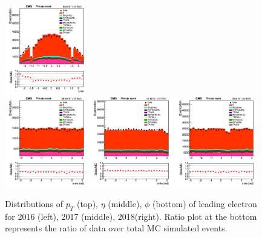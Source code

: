 \documentclass{cernatlasnote}
\newcommand{\pt}{$p_{\text T}$\xspace}
\begin{document}
\begin{figure}[htp]
 \includegraphics[width=0.32\textwidth]{images/emu_channel/2018/18_Range_0pt7_1pt3/subleading_electron_eta_trig_Linear.png}\\
 \includegraphics[width=0.32\textwidth]{images/emu_channel/2016/16_Range_0pt7_1pt3/subleading_electron_phi_trig_Linear.png}
\includegraphics[width=0.32\textwidth]{images/emu_channel/2017/17_Range_0pt7_1pt3/subleading_electron_phi_trig_Linear.png}
 \includegraphics[width=0.32\textwidth]{images/emu_channel/2018/18_Range_0pt7_1pt3/subleading_electron_phi_trig_Linear.png} 
 \caption{Distributions of $p_{T}$ (top), $\eta$ (middle), $\phi$ (bottom) of leading electron for 2016 (left), 2017 (middle), 2018(right). Ratio plot at the bottom represents the ratio of data over total MC simulated events.}
 \label{fig:e_dis}
  \end{figure}
\end{document}
